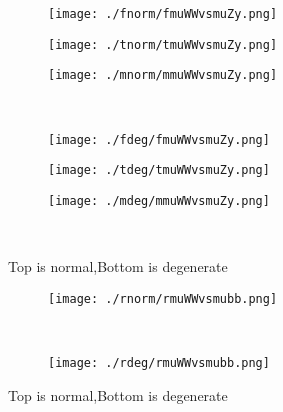 \documentclass[aps,floats,floatfix,nofootinbib]{revtex4-1}
\begin{document}
\begin{center}
\begin{figure}
\begin{subfigure}{0.3\textwidth}
\texttt{[image: ./fnorm/fmuWWvsmuZy.png]}
\label{}
\end{subfigure}
\begin{subfigure}{0.3\textwidth}
\texttt{[image: ./tnorm/tmuWWvsmuZy.png]}
\label{}
\end{subfigure}
\begin{subfigure}{0.3\textwidth}
\texttt{[image: ./mnorm/mmuWWvsmuZy.png]}
\label{}
\end{subfigure}\\
\begin{subfigure}{0.3\textwidth}
\texttt{[image: ./fdeg/fmuWWvsmuZy.png]}
\label{}
\end{subfigure}
\begin{subfigure}{0.3\textwidth}
\texttt{[image: ./tdeg/tmuWWvsmuZy.png]}
\label{}
\end{subfigure}
\begin{subfigure}{0.3\textwidth}
\texttt{[image: ./mdeg/mmuWWvsmuZy.png]}
\label{}
\end{subfigure}\\
\caption{Top is normal,Bottom is degenerate}
\end{figure}
\end{center}

\begin{center}
\begin{figure}
\begin{subfigure}{0.95\textwidth}
\texttt{[image: ./rnorm/rmuWWvsmubb.png]}
\label{}
\end{subfigure}\\
\begin{subfigure}{0.95\textwidth}
\texttt{[image: ./rdeg/rmuWWvsmubb.png]}
\label{}
\end{subfigure}
\caption{Top is normal,Bottom is degenerate}
\end{figure}
\end{center}
\end{document}
